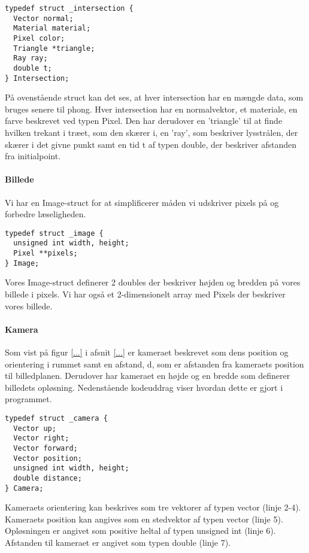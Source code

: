 \begin{lstlisting}[style=Cstyle, caption=Struct til intersection]
typedef struct _intersection {
  Vector normal;
  Material material;
  Pixel color;
  Triangle *triangle;
  Ray ray;
  double t;
} Intersection;
\end{lstlisting}

På ovenstående struct kan det ses, at hver intersection har en mængde data, som bruges senere til phong. Hver intersection har en 
normalvektor, et materiale, en farve beskrevet ved typen Pixel. Den har derudover en 'triangle' til at finde hvilken trekant i træet, som den skærer i, en 'ray', som beskriver lysstrålen, der skærer i det givne punkt samt en tid t af typen double, der beskriver afstanden fra initialpoint.

\paragraph{Billede}
Vi har en Image-struct for at simplificerer måden vi udskriver pixels på og forbedre læseligheden.

\begin{lstlisting}[style=Cstyle, caption=Struct til Image]
typedef struct _image {
  unsigned int width, height;
  Pixel **pixels;
} Image;
\end{lstlisting}

Vores Image-struct definerer 2 doubles der beskriver højden og bredden på vores billede i pixels.
Vi har også et 2-dimensionelt array med Pixels der beskriver vores billede.

\paragraph{Kamera}
Som vist på figur \ref{...} i afsnit \ref{...} er kameraet beskrevet som dens position og orientering i rummet samt en afstand, d, som er afstanden fra kameraets position til billedplanen. Derudover har kameraet en højde og en bredde som definerer billedets opløsning. Nedenstående kodeuddrag viser hvordan dette er gjort i programmet.

\begin{lstlisting}[style=Cstyle, caption=Struct til kamera]
typedef struct _camera {
  Vector up;
  Vector right;
  Vector forward;
  Vector position;
  unsigned int width, height;
  double distance;
} Camera;
\end{lstlisting}

Kameraets orientering kan beskrives som tre vektorer af typen vector (linje 2-4). Kameraets position kan angives som en stedvektor af typen vector (linje 5). Opløsningen er angivet som positive heltal af typen unsigned int (linje 6). Afstanden til kameraet er angivet som typen double (linje 7).

